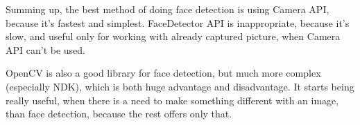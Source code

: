 Summing up, the best method of doing face detection is using Camera API, because
it's fastest and simplest.
FaceDetector API is inappropriate, because it's slow, and useful only for
working with already captured picture, when Camera API can't be used.

OpenCV is also a good library for face detection, but much more complex
(especially NDK), which is both huge advantage and disadvantage.
It starts being really useful, when there is a need to make something different
with an image, than face detection, because the rest offers only that.

